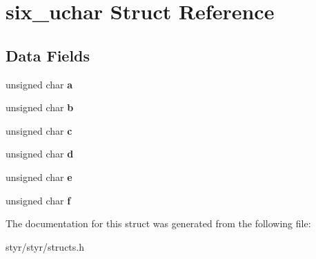 \hypertarget{structsix__uchar}{}\section{six\+\_\+uchar Struct Reference}
\label{structsix__uchar}
\subsection*{Data Fields}
\begin{DoxyCompactItemize}
\item 
unsigned char {\bfseries a}\hypertarget{structsix__uchar_a24420a9beaac7cee08b5e255a4c29db1}{}\label{structsix__uchar_a24420a9beaac7cee08b5e255a4c29db1}

\item 
unsigned char {\bfseries b}\hypertarget{structsix__uchar_a41cede1b4c0d05cff170ad5761f70964}{}\label{structsix__uchar_a41cede1b4c0d05cff170ad5761f70964}

\item 
unsigned char {\bfseries c}\hypertarget{structsix__uchar_a089aacf63ed94ae0e667bb8f6db3e853}{}\label{structsix__uchar_a089aacf63ed94ae0e667bb8f6db3e853}

\item 
unsigned char {\bfseries d}\hypertarget{structsix__uchar_aef7bd9bb1f716afb151a4b4206d468f3}{}\label{structsix__uchar_aef7bd9bb1f716afb151a4b4206d468f3}

\item 
unsigned char {\bfseries e}\hypertarget{structsix__uchar_a78b0af8eb57f2f240016ee37529c6f47}{}\label{structsix__uchar_a78b0af8eb57f2f240016ee37529c6f47}

\item 
unsigned char {\bfseries f}\hypertarget{structsix__uchar_a7ceb8bf372a716e22ab056d1b7df49e7}{}\label{structsix__uchar_a7ceb8bf372a716e22ab056d1b7df49e7}

\end{DoxyCompactItemize}


The documentation for this struct was generated from the following file\+:\begin{DoxyCompactItemize}
\item 
styr/styr/structs.\+h\end{DoxyCompactItemize}
